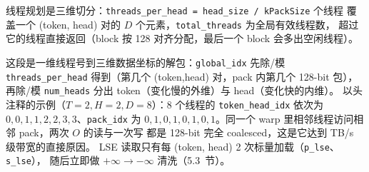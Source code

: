 线程规划是三维切分：\texttt{threads\_\allowbreak{}per\_\allowbreak{}head =\allowbreak{} head\_\allowbreak{}size /\allowbreak{} k\allowbreak{}Pack\allowbreak{}Size} 个线程
覆盖一个 (token, head) 对的 $D$ 个元素，\texttt{total\_\allowbreak{}threads} 为全局有效线程数，
超过它的线程直接返回（block 按 128 对齐分配，最后一个 block 会多出空闲线程）。



这段是一维线程号到三维数据坐标的解包：\texttt{global\_idx} 先除/模
\texttt{threads\_\allowbreak{}per\_\allowbreak{}head} 得到（第几个 (token,head) 对，pack 内第几个 128-bit 包），
再除/模 \texttt{num\_heads} 分出 token（变化慢的外维）与 head（变化快的内维）。
以头注释的示例（$T{=}2, H{=}2, D{=}8$）：8 个线程的
\texttt{token\_\allowbreak{}head\_\allowbreak{}idx} 依次为 $0,0,1,1,2,2,3,3$、\texttt{pack\_idx} 为
$0,1,0,1,0,1,0,1$。同一个 warp 里相邻线程访问相邻 pack，两次 $O$ 的读与一次写
都是 128-bit 完全 coalesced，这是它达到 TB/s 级带宽的直接原因。
LSE 读取只有每 (token, head) 2 次标量加载（\texttt{p\_lse}、\texttt{s\_lse}），
随后立即做 $+\infty \to -\infty$ 清洗（5.3~节）。

